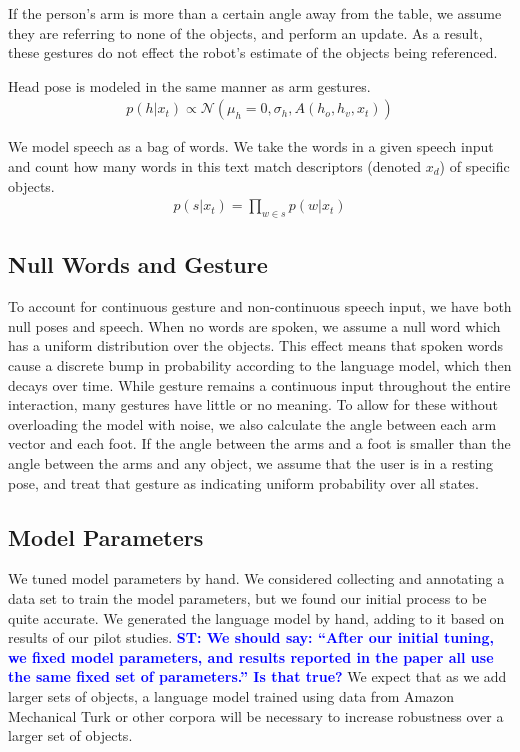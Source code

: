 \documentclass[letterpaper, 10 pt, conference]{ieeeconf}
\newcommand{\stnote}[1]{\textcolor{Blue}{\textbf{ST: #1}}}
\begin{document}
If the person's arm is more than a certain angle away from the table,
we assume they are referring to none of the objects, and perform an
update.  As a result, these gestures do not effect the robot's
estimate of the objects being referenced.

Head pose is modeled in the same manner as arm gestures.
\begin{align}
p(h | x_t) \propto \mathcal{N}(\mu_h=0, \sigma_h,A(h_o, h_v, x_t))
\end{align}


  We model speech as a bag of words. We
take the words in a given speech input and count how many words in
this text match descriptors (denoted $x_d$) of specific objects.
\begin{align}
p(s |x_t) = \displaystyle \prod_{w \in s} p(w | x_t)
\end{align}


\subsection{Null Words and Gesture}

To account for continuous gesture and non-continuous speech input, we
have both null poses and speech.  When no words are spoken, we assume
a null word which has a uniform distribution over the objects.  This
effect means that spoken words cause a discrete bump in probability
according to the language model, which then decays over time. While
gesture remains a continuous input throughout the entire interaction,
many gestures have little or no meaning. To allow for these without
overloading the model with noise, we also calculate the angle between
each arm vector and each foot. If the angle between the arms and a
foot is smaller than the angle between the arms and any object, we
assume that the user is in a resting pose, and treat that gesture as
indicating uniform probability over all states.

\subsection{Model Parameters}
We tuned model parameters by hand.  We considered collecting and
annotating a data set to train the model parameters, but we found our
initial process to be quite accurate. We generated the language model
by hand, adding to it based on results of our pilot
studies. \stnote{We should say: ``After our initial tuning, we fixed
  model parameters, and results reported in the paper all use the same
  fixed set of parameters.''  Is that true?}  We expect that as we add
larger sets of objects, a language model trained using data from
Amazon Mechanical Turk or other corpora will be necessary to increase
robustness over a larger set of objects.  
\end{document}
